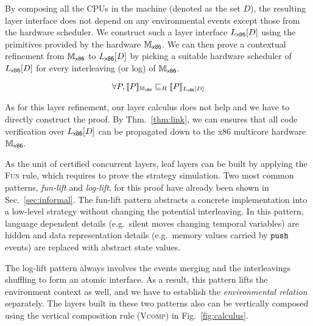 By composing all the CPUs in the machine (denoted as the set $D$), the resulting 
layer interface does not depend on any environmental events except those from the hardware scheduler.
We construct such a layer interface $\PBoot[D]$
using the primitives provided by the hardware $\Mach_{\boot}$. 
We can then prove a contextual refinement from  $\Mach_{\boot}$ to $\PLayer{\PBoot}{D}{}$  by
picking a suitable hardware scheduler of $\PBoot[D]$  for every interleaving (or log) of $\Mach_{\boot}$.
\begin{theorem}
\label{thm:link}
\begin{small}
$$\forall P, \sem{\Mach_{\boot}}{P} \refines_R \sem{\PLayer{\PBoot}{D}{}}{P}$$
\end{small}
\end{theorem}%
As for this layer refinement, our layer calculus does not help and we have to
 directly construct the proof. By
Thm.~\ref{thm:link}, we can
ensures that all code verification over $\PBoot[D]$ can be propagated down to the x86 multicore hardware 
$\Mach_{\boot}$.

As the unit of certified concurrent layers, leaf layers can be built by applying the \textsc{Fun} rule, which requires to prove the strategy simulation.
Two most common patterns, \emph{fun-lift} and \emph{log-lift}, for this proof have already been shown in Sec.~\ref{sec:informal}.
The fun-lift pattern abstracts a concrete implementation into a low-level strategy without changing the potential interleaving. In this pattern, language dependent details (e.g.\, silent moves changing temporal variables) are hidden
and data representation details (e.g.\, memory values carried by $\push$ events) are replaced with abstract state values.


The log-lift pattern always involves the events merging
and the interleavings shuffling to form an atomic interface.
As a result, this pattern lifts the environment context as well,
and we have to establish the \emph{environmental relation} separately.
The layers built in these two patterns also can be vertically
composed using the vertical composition rule (\textsc{Vcomp}) in Fig.~\ref{fig:calculus}.